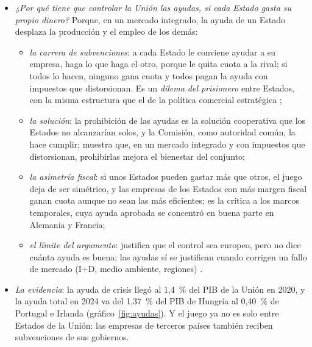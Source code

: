 \documentclass[11pt]{article}
\begin{document}
\begin{itemize}
\item \emph{¿Por qué tiene que controlar la Unión las ayudas, si cada Estado gasta su propio dinero?} Porque, en un mercado integrado, la ayuda de un Estado desplaza la producción y el empleo de los demás:
  \begin{itemize}
  \item \emph{la carrera de subvenciones}: a cada Estado le conviene ayudar a su empresa, haga lo que haga el otro, porque le quita cuota a la rival; si todos lo hacen, ninguno gana cuota y todos pagan la ayuda con impuestos que distorsionan. Es un \emph{dilema del prisionero} entre Estados, con la misma estructura que el de la política comercial estratégica  ;
  \item \emph{la solución}: la prohibición de las ayudas es la solución cooperativa que los Estados no alcanzarían solos, y la Comisión, como autoridad común, la hace cumplir; \textcite{Collie2000State} muestra que, en un mercado integrado y con impuestos que distorsionan, prohibirlas mejora el bienestar del conjunto;
  \item \emph{la asimetría fiscal}: si unos Estados pueden gastar más que otros, el juego deja de ser simétrico, y las empresas de los Estados con más margen fiscal ganan cuota aunque no sean las más eficientes; es la crítica a los marcos temporales, cuya ayuda aprobada se concentró en buena parte en Alemania y Francia;
  \item \emph{el límite del argumento}: justifica que el control sea europeo, pero no dice cuánta ayuda es buena; las ayudas sí se justifican cuando corrigen un fallo de mercado (I+D, medio ambiente, regiones)\nocite{BesleySeabright1999Effects} .
  \end{itemize}
\item \emph{La evidencia}: la ayuda de crisis llegó al 1,4~\% del PIB de la Unión en 2020, y la ayuda total en 2024 va del 1,37~\% del PIB de Hungría al 0,40~\% de Portugal e Irlanda (gráfico~\ref{fig:ayudas}). Y el juego ya no es solo entre Estados de la Unión: las empresas de terceros países también reciben subvenciones de sus gobiernos.
\end{itemize}
\end{document}
